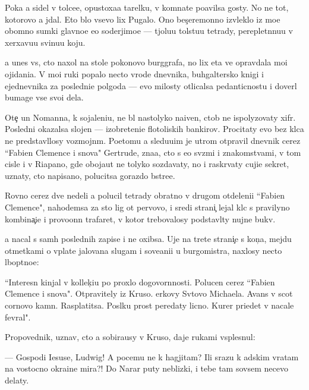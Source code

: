 \documentclass[10pt]{book}
\begin{document}
Poka {\y}a sidel v tolce{\y}e, opustoxa{\y}a tarelku, v komnate po{\y}avilsa gosty. No ne tot, kotorovo {\y}a jdal. Eto b{\yi}lo vsevo lix Pugalo. Ono bes{\c}eremonno izvleklo iz mo{\y}e{\y} ob{\y}omno{\y} sumki glavno{\y}e {\y}e{\y}o soderjimo{\y}e — t{\ia}jolu{\y}u tolstu{\y}u tetrady, pereplet{\e}nnu{\y}u v xerxavu{\y}u svinu{\y}u koju.

{\Y}a unes vs{\e}, cto naxol na stole poko{\y}novo burggrafa, no lix eta ve{\x} opravdala mo{\y}i ojidani{\y}a. V mo{\y}i ruki popalo necto vrode dnevnika, buhgaltersko{\y} knigi i {\y}ejednevnika za posledni{\y}e polgoda — {\y}evo milosty otlicalsa pedanticnost{\y}u i dover{\ia}l bumage vse svo{\y}i dela.

Ote{\c} un Nomanna, k sojaleni{\y}u, ne b{\yi}l nastolyko naiven, ctob{\yi} ne ispolyzovaty xifr. Posledni{\y} okazalsa slojen — izobreteni{\y}e flotoli{\y}skih bankirov. Procitaty {\y}evo bez kl{\iu}ca ne predstavl{\ia}losy vozmojn{\yi}m. Poetomu {\y}a sledu{\y}u{\x}im je utrom otpravil dnevnik cerez ``Fabien Clemence i s{\yi}nov{\y}a" Gertrude, zna{\y}a, cto s {\y}e{\y}o sv{\ia}z{\ia}mi i znakomstvami, v tom cisle i v Riapano, gde oboja{\y}ut ne tolyko sozdavaty, no i raskr{\yi}vaty cuji{\y}e sekret{\yi}, uznaty, cto napisano, polucitsa gorazdo b{\yi}stre{\y}e.

Rovno cerez dve nedeli {\y}a polucil tetrady obratno v drugom otdeleni{\y}i ``Fabien Clemence", nahod{\ia}{\x}emsa za sto lig ot pervovo, i sredi strani{\c} lejal kl{\iu}c s pravilyno{\y} kombina{\c}i{\y}e{\y} i provo{\x}onn{\yi}{\y} trafaret, v kotor{\yi}{\y} trebovalosy podstavl{\ia}ty nujn{\yi}{\y}e bukv{\yi}.

{\Y}a nacal s sam{\yi}h poslednih zapise{\y} i ne oxibsa. Uje na tret{\y}e{\y} strani{\c}e s kon{\c}a, mejdu otmetkami o v{\yi}plate jalovan{\y}a slugam i sove{\x}ani{\y}i u burgomistra, naxlosy necto l{\iu}bop{\yi}tno{\y}e:

``Interesn{\yi}{\y} kinjal v kollek{\c}i{\y}u po proxlo{\y} dogovor{\e}nnosti. Polucen cerez ``Fabien Clemence i s{\yi}nov{\y}a". Otpravitely iz Kruso. {\C}erkovy Sv{\ia}tovo Michaela. Avans v scot cornovo kamn{\ia}. Rasplatitsa. Pos{\yi}lku pros{\ia}t peredaty licno. Kur{\y}er pri{\y}edet v nacale fevral{\ia}".



Propovednik, uznav, cto {\y}a sobira{\y}usy v Kruso, daje rukami vsplesnul:

— Gospodi Iesuse, Ludwig! A pocemu ne k hagjitam? Ili srazu k adskim vratam na vostocno{\y} okra{\y}ine mira?! Do Narar{\yi} puty neblizki{\y}, i tebe tam sovsem necevo delaty.
\end{document}
